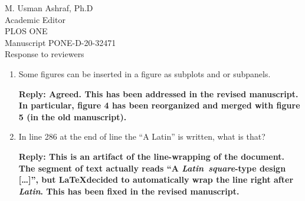 \documentclass[10pt, letterpaper]{letter}
\newenvironment{QandA}
{\begin{enumerate}[
    label={\bfseries Comment \arabic*:}, 
    wide,
    ref={Comment \arabic*}]}
{\end{enumerate}}
\newenvironment{answered}
{\medskip\par\bfseries Reply: \normalfont}
{\par\noindent\makebox[\linewidth]{\rule{\textwidth}{0.4pt}}\bigskip}
\begin{document}
\begin{letter}{
    M. Usman Ashraf, Ph.D\\
    Academic Editor\\
    PLOS ONE\\
    \medskip
    Manuscript PONE-D-20-32471\\
    Response to reviewers\\
}
\begin{QandA}
    \item Some figures can be inserted in a figure as subplots and or subpanels.
    
    \begin{answered}
        Agreed.
        This has been addressed in the revised manuscript.
        In particular, figure 4 has been reorganized and merged with figure 5 (in the old manuscript).
    \end{answered}

    \item In line 286 at the end of line the ``A Latin'' is written, what is that?
    
    \begin{answered}
        This is an artifact of the line-wrapping of the document.
        The segment of text actually reads ``A \emph{Latin~square}-type design [\ldots]'', but \LaTeX decided to automatically wrap the line right after \emph{Latin}.
        This has been fixed in the revised manuscript.
    \end{answered}

\end{QandA}

\pagebreak

\begingroup\setlength{\multicolsep}{0pt}
\begin{multicols}{2}[]
    \printbibliography[heading=letterbib]
\end{multicols}\endgroup
\end{letter}
\end{document}
